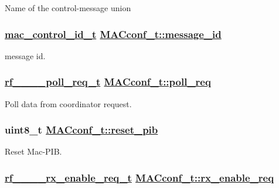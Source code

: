Name of the control-message union \hypertarget{structMACconf__t_7d4dad417562c658e705accd2bf0ddd6}{
\subsubsection[message\_\-id]{\setlength{\rightskip}{0pt plus 5cm}\hyperlink{rf__802__15__4_8h_01e0aae058da837b0908ec100a76e3d3}{mac\_\-control\_\-id\_\-t} \hyperlink{structMACconf__t_7d4dad417562c658e705accd2bf0ddd6}{MACconf\_\-t::message\_\-id}}}
\label{structMACconf__t_7d4dad417562c658e705accd2bf0ddd6}


message id. \hypertarget{structMACconf__t_33c70a1389613a28534827454b214c78}{
\subsubsection[poll\_\-req]{\setlength{\rightskip}{0pt plus 5cm}\hyperlink{structrf__802__15__4__poll__req__t}{rf\_\_\_\_\-poll\_\-req\_\-t} \hyperlink{structMACconf__t_33c70a1389613a28534827454b214c78}{MACconf\_\-t::poll\_\-req}}}
\label{structMACconf__t_33c70a1389613a28534827454b214c78}


Poll data from coordinator request. \hypertarget{structMACconf__t_2b7fa48ad7fcf57826a84788de348506}{
\subsubsection[reset\_\-pib]{\setlength{\rightskip}{0pt plus 5cm}uint8\_\-t \hyperlink{structMACconf__t_2b7fa48ad7fcf57826a84788de348506}{MACconf\_\-t::reset\_\-pib}}}
\label{structMACconf__t_2b7fa48ad7fcf57826a84788de348506}


Reset Mac-PIB. \hypertarget{structMACconf__t_605ed174a898d40031b09106bb52652b}{
\subsubsection[rx\_\-enable\_\-req]{\setlength{\rightskip}{0pt plus 5cm}\hyperlink{structrf__802__15__4__rx__enable__req__t}{rf\_\_\_\_\-rx\_\-enable\_\-req\_\-t} \hyperlink{structMACconf__t_605ed174a898d40031b09106bb52652b}{MACconf\_\-t::rx\_\-enable\_\-req}}}
\label{structMACconf__t_605ed174a898d40031b09106bb52652b}


